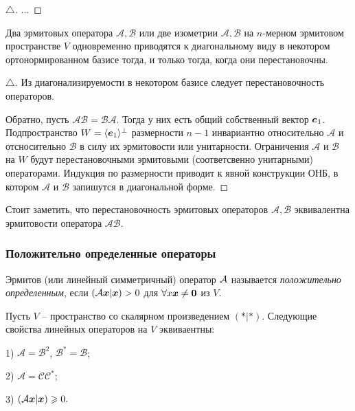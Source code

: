 \begin{proof}[$\triangle$]
   ... 
\end{proof}


\begin{to_thr} 
    Два эрмитовых оператора $\mathcal A, \mathcal B$ или две изометрии $\mathcal A, \mathcal B$ на $n$-мерном эрмитовом пространстве $V$ одновременно приводятся к диагональному виду в некотором ортонормированном базисе тогда, и только тогда, когда они перестановочны.
\end{to_thr}

\begin{proof}[$\triangle$]
    Из диагонализируемости в некотором базисе следует перестановочность операторов.

    Обратно, пусть $\mathcal{AB} = \mathcal{BA}$. Тогда у них есть общий собственный вектор $\mbox{\boldmath $e$}_{1}$. Подпространство $W = \langle \mbox{\boldmath $e$}_1\rangle^{\bot}$ размерности $n-1$ инвариантно относительно $\mathcal A$ и отсносительно $\mathcal B$ в силу их эрмитовости или унитарности. Ограничения $\mathcal A$ и $\mathcal B$  на $W$ будут перестановочными эрмитовыми (соответсвенно унитарными) операторами. Индукция по размерности приводит к явной конструкции ОНБ, в котором $\mathcal A$ и $\mathcal B$ запишутся в диагональной форме.
\end{proof}

Стоит заметить, что перестановочность эрмитовых операторов $\mathcal A, \mathcal B$ эквивалентна эрмитовости оператора $\mathcal{AB}$. 


\subsubsection{Положительно определенные операторы}
\begin{to_def} 
    Эрмитов (или линейный симметричный) оператор $\mathcal A$ называется \textit{положительно определенным}, если $(\mathcal A \mbox{\boldmath $x$} | \mbox{\boldmath $x$}) > 0$ для $\forall x\mbox{\boldmath $x$} \neq \mbox{\boldmath $0$}$ из $V$. 
\end{to_def}


\begin{to_thr} 
    Пусть $V$ -- пространство со скалярном произведением $(*|*)$. Следующие свойства линейных операторов на $V$ эквиваентны:

    1) $\mathcal A = \mathcal B^2$, $\mathcal B^* = \mathcal B$;

    2) $\mathcal A = \mathcal C \mathcal C^*$;

    3) $(\mathcal A \mbox{\boldmath $x$} | \mbox{\boldmath $x$}) \geqslant 0.$
\end{to_thr}


